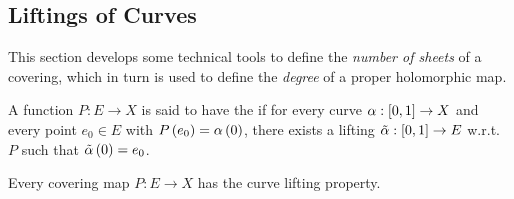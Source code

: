\documentclass[../Moduli_Spaces_of_Riemann_Surfaces.tex]{subfiles}
\begin{document}
    \subsection{Liftings of Curves}
    This section develops some technical tools to define the \textit{number of sheets} of a covering, which in turn is used to define the \textit{degree} of a proper holomorphic map.
    \begin{definition}
        A function $P:E\to X$ is said to have the  if for every curve $\alpha:\left[0,1\right]\to X$ and every point $e_0\in E$ with $P\left(e_0\right)=\alpha\left(0\right)$, there exists a lifting $\tilde{\alpha}:\left[0,1\right]\to E$ w.r.t. $P$ such that $\tilde{\alpha}\left(0\right)=e_0$.
    \end{definition}
    \begin{proposition}
        Every covering map $P:E\to X$ has the curve lifting property.
    \end{proposition}
\end{document}
